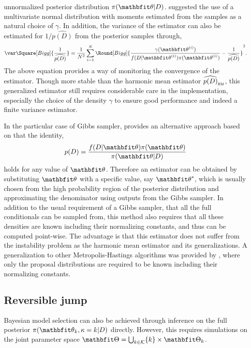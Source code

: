 \documentclass[11pt, hyper, bib, fontset=Minion]{marticle}
\begin{document}
unnormalized posterior distribution $\pi(\bth|D)$. \textcite{Gelfand:1994ux}
suggested the use of a multivariate normal distribution with moments estimated
from the samples as a natural choice of $\gamma$. In addition, the variance of
the estimator can also be estimated for $1/\widehat{p(D)}$ from the posterior
samples through,
\begin{equation}
  \var\Square[Bigg]{\frac{1}{\widehat{p(D)}}} =
  \frac{1}{N^2}\sum_{i=1}^N \Round[Bigg]{
    \frac{\gamma(\bthiu)}{f(D|\bthiu)\pi(\bthiu)}
    - \frac{1}{\widehat{p(D)}}}^2.
\end{equation}
The above equation provides a way of monitoring the convergence of the
estimator. Though more stable than the harmonic mean estimator
$\widehat{p(D)}_{\text{\textsc{hm}}}$, this generalized estimator still
requires considerable care in the implementation, especially the choice of the
density $\gamma$ to ensure good performance and indeed a finite variance
estimator.

In the particular case of Gibbs sampler, \textcite{Chib:1995em} provides an
alternative approach based on that the identity,
\begin{equation}
  p(D) = \frac{f(D|\bth)\pi(\bth)}{\pi(\bth|D)}
\end{equation}
holds for any value of $\bth$. Therefore an estimator can be obtained by
substituting $\bth$ with a specific value, say $\bth^*$, which is usually
chosen from the high probability region of the posterior distribution and
approximating the denominator using outputs from the Gibbs sampler. In
addition to the usual requirement of a Gibbs sampler, that all the full
conditionals can be sampled from, this method also requires that all these
densities are known including their normalizing constants, and thus can be
computed point-wise. The advantage is that this estimator does not suffer from
the instability problem as the harmonic mean estimator and its
generalizations. A generalization to other Metropolis-Hastings algorithms was
provided by \textcite{Chib:2001gq}, where only the proposal distributions are
required to be known including their normalizing constants.

\subsection{Reversible jump \protect\mcmc}
\label{sub:Reversible jump mcmc}

Bayesian model selection can also be achieved through inference on the full
posterior $\pi(\bth_k,\kappa=k|D)$ directly. However, this requires
simulations on the joint parameter space $\bTh = \bigcup_{k\in\calK} \{k\}
\times \bTh_k$.
\end{document}
